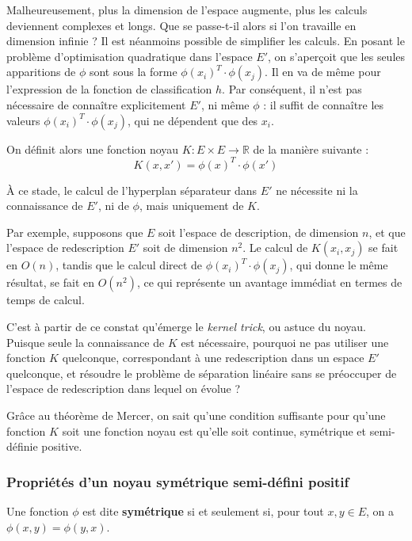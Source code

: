 Malheureusement, plus la dimension de l'espace augmente, plus les calculs deviennent complexes et longs. Que se passe-t-il alors si l'on travaille en dimension infinie ? Il est néanmoins possible de simplifier les calculs. En posant le problème d'optimisation quadratique dans l'espace $E'$, on s'aperçoit que les seules apparitions de $\phi$ sont sous la forme $\phi(x_i)^T \cdot \phi(x_j)$. Il en va de même pour l'expression de la fonction de classification $h$. Par conséquent, il n'est pas nécessaire de connaître explicitement $E'$, ni même $\phi$ : il suffit de connaître les valeurs $\phi(x_i)^T \cdot \phi(x_j)$, qui ne dépendent que des $x_i$.

On définit alors une fonction noyau $K : E \times E \to \mathbb{R}$ de la manière suivante :
\begin{equation}
K(x, x') = \phi(x)^T \cdot \phi(x')
\end{equation}

À ce stade, le calcul de l'hyperplan séparateur dans $E'$ ne nécessite ni la connaissance de $E'$, ni de $\phi$, mais uniquement de $K$.

Par exemple, supposons que $E$ soit l'espace de description, de dimension $n$, et que l'espace de redescription $E'$ soit de dimension $n^2$. Le calcul de $K(x_i, x_j)$ se fait en $O(n)$, tandis que le calcul direct de $\phi(x_i)^T \cdot \phi(x_j)$, qui donne le même résultat, se fait en $O(n^2)$, ce qui représente un avantage immédiat en termes de temps de calcul.

C'est à partir de ce constat qu'émerge le \emph{kernel trick}, ou astuce du noyau. Puisque seule la connaissance de $K$ est nécessaire, pourquoi ne pas utiliser une fonction $K$ quelconque, correspondant à une redescription dans un espace $E'$ quelconque, et résoudre le problème de séparation linéaire sans se préoccuper de l'espace de redescription dans lequel on évolue ?

Grâce au théorème de Mercer, on sait qu'une condition suffisante pour qu'une fonction $K$ soit une fonction noyau est qu'elle soit continue, symétrique et semi-définie positive.

\subsubsection*{Propriétés d'un noyau symétrique semi-défini positif}

Une fonction $\phi$ est dite \textbf{symétrique} si et seulement si, pour tout $x, y \in E$, on a $\phi(x, y) = \phi(y, x)$.


